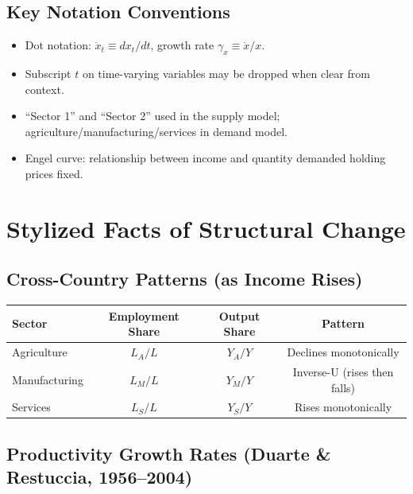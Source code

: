 \documentclass[a4paper,11pt]{article}
\newcommand{\LA}{L_A}
\newcommand{\LM}{L_M}
\newcommand{\LS}{L_S}
\newcommand{\YA}{Y_A}
\newcommand{\YM}{Y_M}
\newcommand{\YS}{Y_S}
\begin{document}
\subsection*{Key Notation Conventions}
\begin{itemize}[nosep]
    \item Dot notation: $\dot{x}_t \equiv dx_t/dt$, growth rate $\gamma_x \equiv \dot{x}/x$.
    \item Subscript $t$ on time-varying variables may be dropped when clear from context.
    \item ``Sector 1'' and ``Sector 2'' used in the supply model; agriculture/manufacturing/services in demand model.
    \item Engel curve: relationship between income and quantity demanded holding prices fixed.
\end{itemize}

\clearpage

\section{Stylized Facts of Structural Change}

\subsection*{Cross-Country Patterns (as Income Rises)}

\begin{center}
\begin{tabular}{lccc}
\toprule
\textbf{Sector} & \textbf{Employment Share} & \textbf{Output Share} & \textbf{Pattern} \\
\midrule
Agriculture & $\LA/L$ & $\YA/Y$ & Declines monotonically \\
Manufacturing & $\LM/L$ & $\YM/Y$ & Inverse-U (rises then falls) \\
Services & $\LS/L$ & $\YS/Y$ & Rises monotonically \\
\bottomrule
\end{tabular}
\end{center}

\subsection*{Productivity Growth Rates (Duarte \& Restuccia, 1956--2004)}
\end{document}
